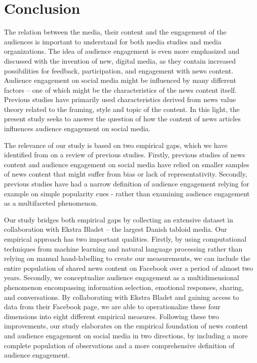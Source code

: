 \documentclass[
]{article}
\begin{document}
\pagebreak

\hypertarget{conclusion}{%
\section{Conclusion}\label{conclusion}}

The relation between the media, their content and the engagement of the
audiences is important to understand for both media studies and media
organizations. The idea of audience engagement is even more emphasized
and discussed with the invention of new, digital media, as they contain
increased possibilities for feedback, participation, and engagement with
news content. Audience engagement on social media might be influenced by
many different factors -- one of which might be the characteristics of
the news content itself. Previous studies have primarily used
characteristics derived from news value theory related to the framing,
style and topic of the content. In this light, the present study seeks
to answer the question of how the content of news articles influences
audience engagement on social media.

The relevance of our study is based on two empirical gaps, which we have
identified from on a review of previous studies. Firstly, previous
studies of news content and audience engagement on social media have
relied on smaller samples of news content that might suffer from bias or
lack of representativity. Secondly, previous studies have had a narrow
definition of audience engagement relying for example on simple
popularity cues - rather than examining audience engagement as a
multifaceted phenomenon.

Our study bridges both empirical gaps by collecting an extensive dataset
in collaboration with Ekstra Bladet -- the largest Danish tabloid media.
Our empirical approach has two important qualities. Firstly, by using
computational techniques from machine learning and natural language
processing rather than relying on manual hand-labelling to create our
measurements, we can include the entire population of shared news
content on Facebook over a period of almost two years. Secondly, we
conceptualize audience engagement as a multidimensional phenomenon
encompassing information selection, emotional responses, sharing, and
conversations. By collaborating with Ekstra Bladet and gaining access to
data from their Facebook page, we are able to operationalize these four
dimensions into eight different empirical measures. Following these two
improvements, our study elaborates on the empirical foundation of news
content and audience engagement on social media in two directions, by
including a more complete population of observations and a more
comprehensive definition of audience engagement.
\end{document}

